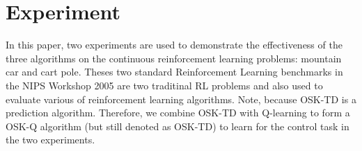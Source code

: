 \documentclass[conference]{IEEEtran}
\begin{document}


\section{Experiment}
In this paper, two experiments are used to demonstrate the effectiveness of the three algorithms on the continuous reinforcement learning problems: mountain car and cart pole. Theses two standard Reinforcement Learning benchmarks in the NIPS Workshop 2005 are two traditinal RL problems and also used to evaluate various of reinforcement learning algorithms. Note, because OSK-TD is a prediction algorithm. Therefore, we combine OSK-TD with Q-learning to form a OSK-Q algorithm (but still denoted as OSK-TD) to learn for the control task in the two experiments.\\
\end{document}
